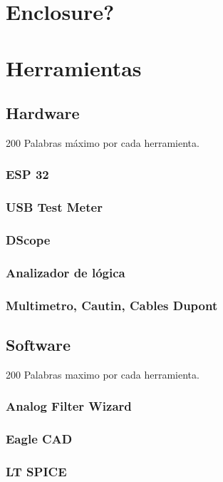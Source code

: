 \documentclass[11pt]{article}
\begin{document}
\section{\textbf{\textbf{\textbf{Enclosure?}}}}
\label{sec:orgd12fc24}
\section{Herramientas}
\label{sec:org172074f}
\subsection{Hardware}
\label{sec:orgd5b6d76}
200 Palabras máximo por cada herramienta.\\
\subsubsection{ESP 32}
\label{sec:org937c395}
\subsubsection{USB Test Meter}
\label{sec:org411df64}
\subsubsection{DScope}
\label{sec:org4346a27}
\subsubsection{Analizador de lógica}
\label{sec:org82ad2e8}
\subsubsection{Multimetro, Cautin, Cables Dupont}
\label{sec:org99039a3}
\subsection{Software}
\label{sec:orgcdcc6b6}
200 Palabras maximo por cada herramienta.\\
\subsubsection{Analog Filter Wizard}
\label{sec:org4d889c4}
\subsubsection{Eagle CAD}
\label{sec:orgd437424}
\subsubsection{LT SPICE}
\label{sec:org87f9600}
\end{document}

